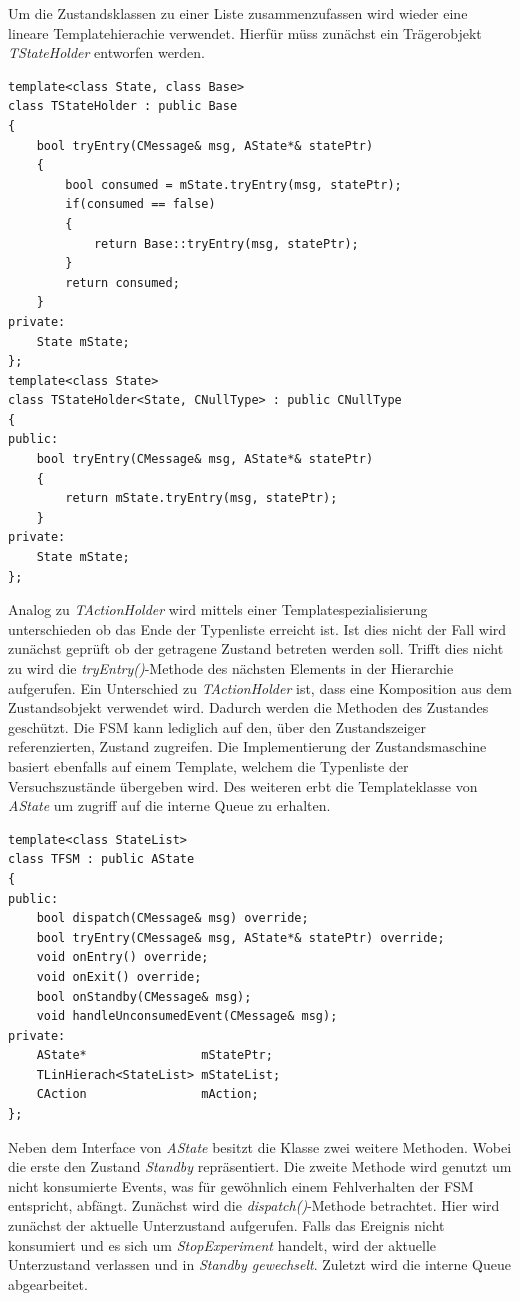Um die Zustandsklassen zu einer Liste zusammenzufassen wird wieder eine lineare Templatehierachie verwendet. Hierfür müss zunächst ein Trägerobjekt \textit{TStateHolder} entworfen werden. 
\begin{lstlisting}[caption={Implementierung der Trägerklasse für Zustände},captionpos=b]
template<class State, class Base>
class TStateHolder : public Base
{
	bool tryEntry(CMessage& msg, AState*& statePtr)
	{
		bool consumed = mState.tryEntry(msg, statePtr);
		if(consumed == false)
		{
			return Base::tryEntry(msg, statePtr);
		}
		return consumed;
	}
private:
	State mState;
};
template<class State>
class TStateHolder<State, CNullType> : public CNullType
{
public:
	bool tryEntry(CMessage& msg, AState*& statePtr)
	{
		return mState.tryEntry(msg, statePtr);
	}
private:
	State mState;
};
\end{lstlisting}
Analog zu \textit{TActionHolder} wird mittels einer Templatespezialisierung unterschieden ob das Ende der Typenliste erreicht ist. Ist dies nicht der Fall wird zunächst geprüft ob der getragene Zustand betreten werden soll. Trifft dies nicht zu wird  die \textit{tryEntry()}-Methode des nächsten Elements in der Hierarchie aufgerufen. Ein Unterschied zu \textit{TActionHolder} ist, dass eine Komposition aus dem Zustandsobjekt verwendet wird. Dadurch werden die Methoden des Zustandes geschützt. Die FSM kann lediglich auf den, über den Zustandszeiger referenzierten, Zustand zugreifen.
Die Implementierung der Zustandsmaschine basiert ebenfalls auf einem Template, welchem die Typenliste der Versuchszustände übergeben wird. Des weiteren erbt die Templateklasse von \textit{AState} um zugriff auf die interne Queue zu erhalten.
\begin{lstlisting}[caption={Implementierung der Templateklasse für die Zustandsmaschine},captionpos=b]
template<class StateList>
class TFSM : public AState
{
public:
	bool dispatch(CMessage& msg) override;
	bool tryEntry(CMessage& msg, AState*& statePtr) override;
	void onEntry() override;
	void onExit() override;
	bool onStandby(CMessage& msg);
	void handleUnconsumedEvent(CMessage& msg);
private:
	AState*                mStatePtr;
	TLinHierach<StateList> mStateList;
	CAction                mAction;
};
\end{lstlisting}
Neben dem Interface von \textit{AState} besitzt die Klasse zwei weitere Methoden. Wobei die erste den Zustand \textit{Standby} repräsentiert. Die zweite Methode wird genutzt um nicht konsumierte Events, was für gewöhnlich einem Fehlverhalten der FSM entspricht, abfängt. Zunächst wird die \textit{dispatch()}-Methode betrachtet. Hier wird zunächst der aktuelle Unterzustand aufgerufen. Falls das Ereignis nicht konsumiert und es sich um \textit{StopExperiment} handelt, wird der aktuelle Unterzustand verlassen und in \textit{Standby gewechselt}. Zuletzt wird die interne Queue abgearbeitet.
